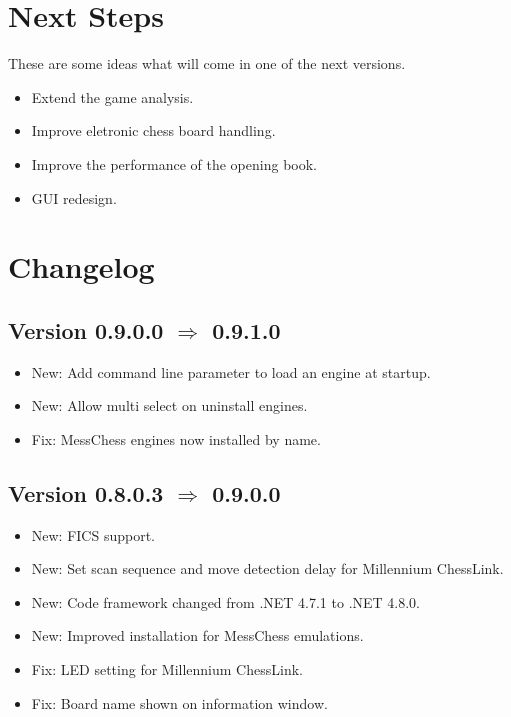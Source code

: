 \documentclass[11pt,a4paper]{article}
\begin{document}
\section{Next Steps}

These are some ideas what will come in one of the next versions.

\begin{itemize}
		\item Extend the game analysis.
		\item Improve eletronic chess board handling.
  	    \item Improve the performance of the opening book.
   		\item GUI redesign.
	\end{itemize} 

\pagebreak

\section{Changelog}

\subsection*{Version 0.9.0.0 $\Rightarrow$  0.9.1.0}
\begin{itemize}
	\item New: Add command line parameter to load an engine at startup.
	\item New: Allow multi select on uninstall engines.
	\item Fix: MessChess engines now installed by name.
\end{itemize}

\subsection*{Version 0.8.0.3 $\Rightarrow$  0.9.0.0}
\begin{itemize}
	\item New: FICS support.
	\item New: Set scan sequence and move detection delay for Millennium ChessLink.
	\item New: Code framework changed from .NET 4.7.1 to .NET 4.8.0.
	\item New: Improved installation for MessChess emulations.
	\item Fix: LED setting for Millennium ChessLink.
	\item Fix: Board name shown on information window.	
\end{itemize}
\end{document}
